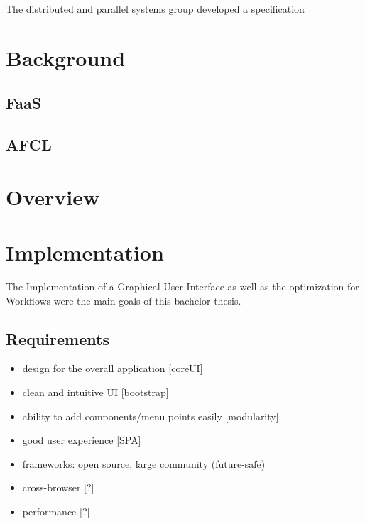\documentclass[a4paper,11pt,pdftex,halfparskip,cleardoubleempty]{scrbook}
\begin{document}
The distributed and parallel systems group developed a specification 

\label{sec:introduction}

\section{Background}

\subsection{FaaS}
\subsection{AFCL}

\section{Overview}

\section{Implementation}
The Implementation of a Graphical User Interface as well as the optimization for Workflows were the main goals of this bachelor thesis. 

\subsection{Requirements}

\begin{itemize}
	\item design for the overall application [coreUI]
	\item clean and intuitive UI [bootstrap]
	\item ability to add components/menu points easily [modularity]
	\item good user experience [SPA]
	\item frameworks: open source, large community (future-safe)
	\item cross-browser [?]
	\item performance [?]
\end{itemize}
\end{document}
